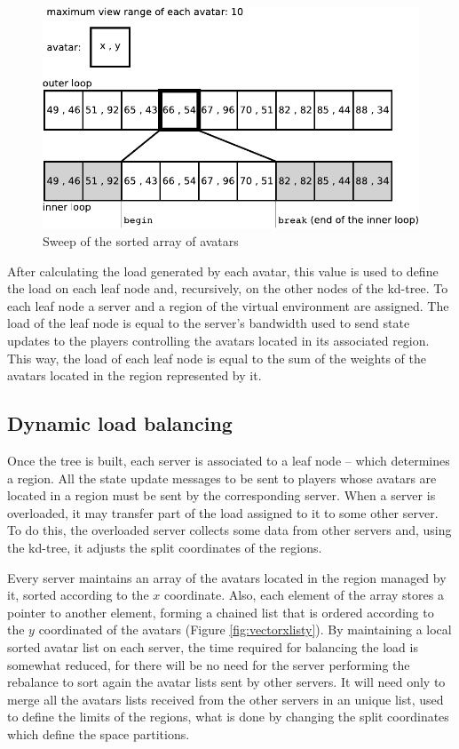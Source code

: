 \documentclass[acmjacm]{acmtrans2m}
\begin{document}
\begin{figure}
  \centering
  \includegraphics[width=0.8\linewidth]{images/sweep}
  \caption{Sweep of the sorted array of avatars}
   \label{fig:sweep}
\end{figure}

After calculating the load generated by each avatar, this value is used to define the load on each leaf node and, recursively, on the other nodes of the kd-tree. To each leaf node a server and a region of the virtual environment are assigned. The load of the leaf node is equal to the server's bandwidth used to send state updates to the players controlling the avatars located in its associated region. This way, the load of each leaf node is equal to the sum of the weights of the avatars located in the region represented by it.

\subsection{Dynamic load balancing}

Once the tree is built, each server is associated to a leaf node -- which determines a region. All the state update messages to be sent to players whose avatars are located in a region must be sent by the corresponding server. When a server is overloaded, it may transfer part of the load assigned to it to some other server. To do this, the overloaded server collects some data from other servers and, using the kd-tree, it adjusts the split coordinates of the regions.

Every server maintains an array of the avatars located in the region managed by it, sorted according to the $x$ coordinate. Also, each element of the array stores a pointer to another element, forming a chained list that is ordered according to the $y$ coordinated of the avatars (Figure \ref{fig:vectorxlisty}). By maintaining a local sorted avatar list on each server, the time required for balancing the load is somewhat reduced, for there will be no need for the server performing the rebalance to sort again the avatar lists sent by other servers. It will need only to merge all the avatars lists received from the other servers in an unique list, used to define the limits of the regions, what is done by changing the split coordinates which define the space partitions.
\end{document}
